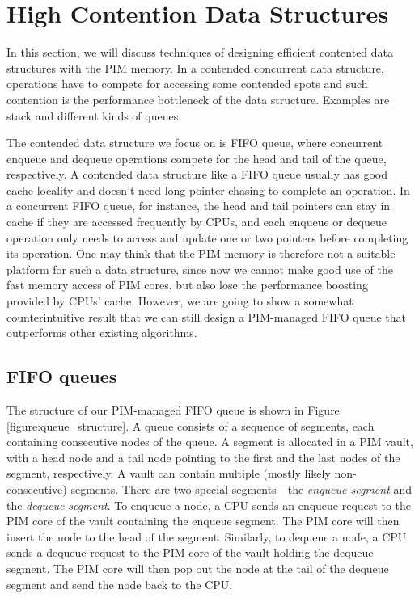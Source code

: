
\section{High Contention Data Structures}
\label{section:contended}
In this section, we will discuss techniques of designing efficient contented data structures 
with the PIM memory.
In a contended concurrent data structure, operations have to compete for accessing some 
contended spots and such contention is the performance bottleneck of the data structure.
Examples are stack and different kinds of queues.

The contended data structure we focus on is FIFO queue, where concurrent enqueue
and dequeue operations compete for the head and tail of the queue, respectively.
A contended data structure like a FIFO queue usually has good cache locality
and doesn't need long pointer chasing to complete an operation.
In a concurrent FIFO queue, for instance, the head and tail pointers can stay in
cache if they are accessed frequently by CPUs, and each enqueue or dequeue
operation only needs to access and update one or two pointers before completing its operation.
One may think that the PIM memory is therefore not a suitable platform for such a data structure,
since now we cannot make good use of the fast memory access of PIM cores, but also
lose the performance boosting provided by CPUs' cache.
However, we are going to show a somewhat counterintuitive result that we can still design
a PIM-managed FIFO queue that outperforms other existing algorithms.

\subsection{FIFO queues}
The structure of our PIM-managed FIFO queue is shown in Figure \ref{figure:queue_structure}.
A queue consists of a sequence of segments, each containing consecutive nodes of the queue.
A segment is allocated in a PIM vault, with a head node and a tail node pointing to the first 
and the last nodes of the segment, respectively.
A vault can contain multiple (mostly likely non-consecutive) segments. 
There are two special segments---the \textit{enqueue segment} and the \textit{dequeue segment}.
To enqueue a node, a CPU sends an enqueue request to the PIM core of the vault 
containing the enqueue segment.
The PIM core will then insert the node to the head of the segment.
Similarly, to dequeue a node, a CPU sends a dequeue request to the PIM core of the vault
holding the dequeue segment. 
The PIM core will then pop out the node at the tail of the dequeue segment and 
send the node back to the CPU.

